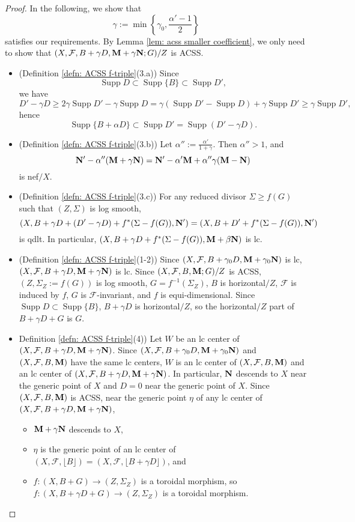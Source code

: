 \documentclass[11pt]{amsart}
\numberwithin{equation}{section}
\newcommand{\Mm}{{\bf{M}}}
\newcommand{\Nn}{{\bf{N}}}
\newcommand{\Supp}{\operatorname{Supp}}
\newcommand{\Ff}{\mathcal{F}}
\theoremstyle{definition}
\theoremstyle{definition}
\theoremstyle{definition}
\begin{document}
\begin{proof}
In the following, we show that
$$\gamma:=\min\left\{\gamma_0,\frac{\alpha'-1}{2}\right\}$$ 
satisfies our requirements. By Lemma \ref{lem: acss smaller coefficient}, we only need to show that $(X,\Ff,B+\gamma D,\Mm+\gamma\Nn;G)/Z$ is ACSS.
\begin{itemize}
    \item (Definition \ref{defn: ACSS f-triple}(3.a)) Since
$$\Supp D\subset\Supp\{B\}\subset\Supp D',$$
we have
$$D'-\gamma D\geq 2\gamma\Supp D'-\gamma\Supp D=\gamma(\Supp D'-\Supp D)+\gamma\Supp D'\geq\gamma\Supp D',$$
hence
$$\Supp\{B+\alpha D\}\subset\Supp D'=\Supp(D'-\gamma D).$$
\item  (Definition \ref{defn: ACSS f-triple}(3.b)) Let $\alpha'':=\frac{\alpha'}{1+\gamma}$. Then $\alpha''>1$, and
$$\Nn'-\alpha''(\Mm+\gamma\Nn)=\Nn'-\alpha'\Mm+\alpha''\gamma(\Mm-\Nn)$$
is nef$/X$.
\item  (Definition \ref{defn: ACSS f-triple}(3.c)) For any reduced divisor $\Sigma\geq f(G)$ such that $(Z,\Sigma)$ is log smooth,
$$(X,B+\gamma D+(D'-\gamma D)+f^*(\Sigma-f(G)),\Nn')=(X,B+D'+f^*(\Sigma-f(G)),\Nn')$$
is qdlt. In particular, $(X,B+\gamma D+f^*(\Sigma-f(G)),\Mm+\beta\Nn)$ is lc.
\item (Definition \ref{defn: ACSS f-triple}(1-2)) Since $(X,\Ff,B+\gamma_0D,\Mm+\gamma_0\Nn)$ is lc, $(X,\Ff,B+\gamma D,\Mm+\gamma \Nn)$ is lc. Since $(X,\Ff,B,\Mm;G)/Z$ is ACSS, $(Z,\Sigma_Z:=f(G))$ is log smooth, $G=f^{-1}(\Sigma_Z)$, $B$ is  horizontal$/Z$, $\Ff$ is induced by $f$, $G$ is $\Ff$-invariant, and $f$ is equi-dimensional. Since $\Supp D\subset\Supp\{B\}$, $B+\gamma D$ is horizontal$/Z$, so the horizontal$/Z$ part of $B+\gamma D+G$ is $G$.
\item Definition \ref{defn: ACSS f-triple}(4)) Let $W$ be an lc center of $(X,\Ff,B+\gamma D,\Mm+\gamma \Nn)$. Since $(X,\Ff,B+\gamma_0 D,\Mm+\gamma_0\Nn)$ and $(X,\Ff,B,\Mm)$ have the same lc centers, $W$ is an lc center of $(X,\Ff,B,\Mm)$ and an lc center of $(X,\Ff,B+\gamma D,\Mm+\gamma \Nn)$. In particular, $\Nn$ descends to $X$ near the generic point of $X$ and $D=0$ near the generic point of $X$. Since $(X,\Ff,B,\Mm)$ is ACSS, near the generic point $\eta$ of any lc center of $(X,\Ff,B+\gamma D,\Mm+\gamma \Nn)$,
\begin{itemize}
    \item $\Mm+\gamma\Nn$ descends to $X$,
    \item $\eta$ is the generic point of an lc center of $(X,\Ff,\lfloor B\rfloor)=(X,\Ff,\lfloor B+\gamma D\rfloor)$, and
    \item $f: (X,B+G)\rightarrow (Z,\Sigma_Z)$ is a toroidal morphism, so $f: (X,B+\gamma D+G)\rightarrow (Z,\Sigma_Z)$ is a toroidal morphism.
\end{itemize}
\end{itemize}
\end{proof}
\end{document}
